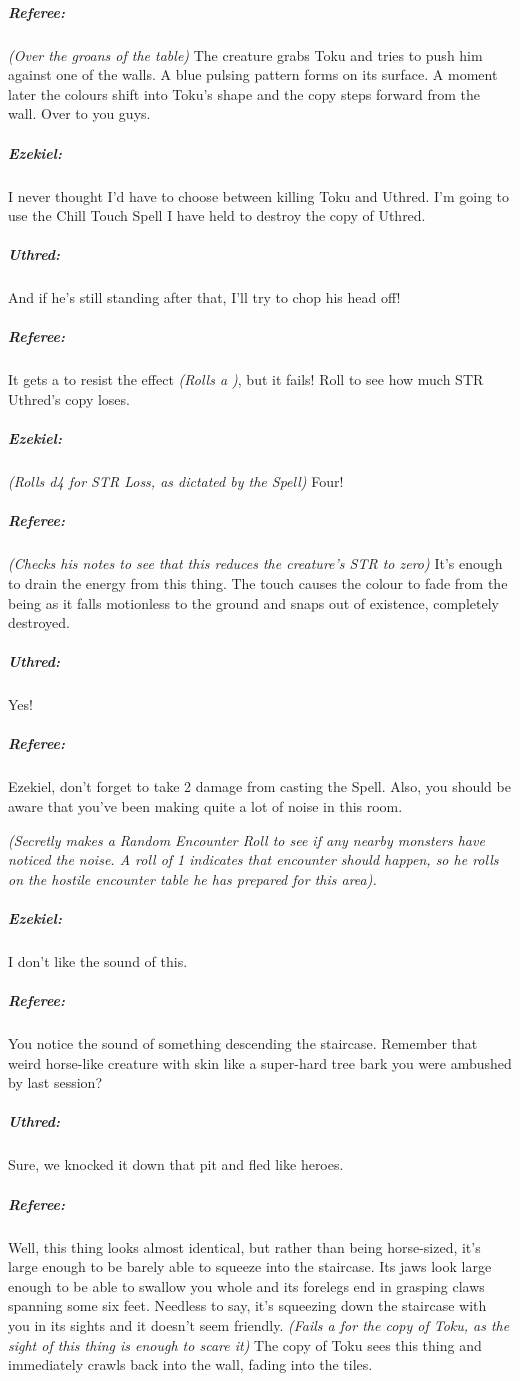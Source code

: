 \documentclass[itdr/core]{subfiles}
\begin{document}
{\subparagraph{Referee:} {\em (Over the groans of the table)} The creature
grabs Toku and tries to push him against one of the walls. A blue pulsing pattern forms on its surface. A moment later the colours shift into Toku's shape and the copy steps forward from the wall. Over to you guys.

\subparagraph{Ezekiel:} I never thought I'd have to choose between killing Toku and Uthred. I'm going to use the Chill Touch Spell I have held to destroy the copy of Uthred.

\subparagraph{Uthred:} And if he's still standing after that, I'll try to chop his head off!

\vfill
\break

\subparagraph{Referee:} It gets a  to resist the effect {\em (Rolls a )}, but it fails! Roll to see how much STR Uthred's copy loses.

\subparagraph{Ezekiel:} {\em (Rolls d4 for STR Loss, as dictated by the
Spell)} Four!

\subparagraph{Referee:} {\em (Checks his notes to see that this reduces the creature's STR to zero)} It's enough to drain the energy from this thing. The touch causes the colour to fade from the being as it falls motionless to the ground and snaps out of existence, completely destroyed.

\subparagraph{Uthred:} Yes!

\subparagraph{Referee:} Ezekiel, don't forget to take 2 damage from casting the Spell. Also, you should be aware that you've been making quite a lot of noise in this room.

{\em (Secretly makes a Random Encounter Roll to see if any nearby monsters have noticed the noise. A roll of 1 indicates that encounter should happen, so he rolls on the hostile encounter table he has prepared for this area).}

\subparagraph{Ezekiel:} I don't like the sound of this.

\subparagraph{Referee:} You notice the sound of something descending the staircase. Remember that weird horse-like creature with skin like a super-hard tree bark you were ambushed by last session?

\subparagraph{Uthred:} Sure, we knocked it down that pit and fled like heroes.

\subparagraph{Referee:} Well, this thing looks almost identical, but rather than being horse-sized, it's large enough to be barely able to squeeze into the staircase. Its jaws look large enough to be able to swallow you whole and its forelegs end in grasping claws spanning some six feet. Needless to say, it's squeezing down the staircase with you in its sights and it doesn't seem friendly. {\em (Fails a  for the copy of Toku, as the sight of this thing is enough to scare it)} The copy of Toku sees this thing and immediately crawls back into the wall, fading into the tiles.

}
\end{document}
